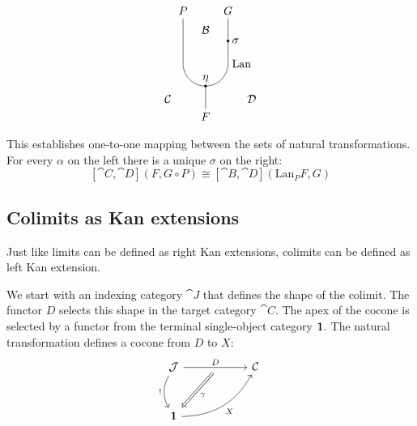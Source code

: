 \documentclass[DaoFP]{subfiles}
\begin{document}
\[\begin{tikzpicture}
\draw (\xb, \ya) to (\xb, \yc) to [out=270, in=180]  (\xc, \yd) to  [out=0, in=270] (\xd, \yc) to (\xd, \ya);
\draw (\xc, \yd) -- (\xc, \ye);

\filldraw[black] (\xc, \yd) circle (1 pt);
\node [above] at (\xc, \yd) {$\eta$};

\filldraw[black] (\xd, \yb) circle (1 pt);
\node [right] at (\xd, \yb) {$\sigma$};

\node[right] at (\xa, \ye + 0.3) {$\mathcal{C}$};
\node[left] at (\xe, \ye + 0.3) {$\mathcal{D}$};
\node[above] at (\xc, \ya - 0.6) {$\mathcal{B}$};
\node [above] at (\xb, \ya) {$P$};
\node [above] at (\xd, \ya) {$G$};
\node [below] at (\xc, \ye) {$F$};
\node [right] at (\xd, \yc) {$\text{Lan}$};

\end{tikzpicture}
\]

This establishes one-to-one mapping between the sets of natural transformations. For every $\alpha$ on the left there is a unique $\sigma$ on the right:
\[  [\cat C, \cat D] (F, G \circ P) \cong [\cat B, \cat D](\text{Lan}_P F , G)  \]

\subsection{Colimits as Kan extensions}

Just like limits can be defined as right Kan extensions, colimits can be defined as left Kan extension. 

We start with an indexing category $\cat J$ that defines the shape of the colimit. The functor $D$ selects this shape in the target category $\cat C$. The apex of the cocone is selected by a functor from the terminal single-object category $\mathbf{1}$. The natural transformation defines a cocone from $D$ to $X$:
\[
 \begin{tikzcd} [row sep=1cm, column sep=1cm]
 \cat J
 \arrow[rr, "D", "" {name=ID, below} ]
 \arrow[d, bend right, "!"']
 && \cat C
 \\
 \Cat 1
  \arrow[urr, bend right, "X"']
 \arrow[Rightarrow, "\gamma",  from=ID]
 \end{tikzcd}
\]
\end{document}
